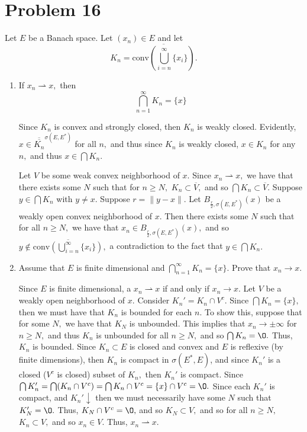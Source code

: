 \documentclass[11pt]{article}
\renewcommand{\emptyset}{\O}
\begin{document}
\section*{Problem 16}
\begin{problem}
    Let $E$ be a Banach space. Let $(x_n)\in E$ and let 
    \[K_n = \overline{\text{conv}\left(\bigcup_{i=n}^\infty\{x_i\}\right)}.\]
\end{problem}
\begin{enumerate}
    \item 
    \begin{problem}
        If $x_n \rightharpoonup x,$ then 
        \[\bigcap_{n=1}^\infty K_n = \{x\}\]
    \end{problem}
    \begin{solution}
    Since $K_n$ is convex and strongly closed, then $K_n$ is weakly closed. Evidently, $x\in \overline{\overline{K_n}}^{\sigma(E, E^*)}$ for all $n,$ and thus since $K_n$ is weakly closed, $x\in K_n$ for any $n,$ and thus $x\in \bigcap K_n.$

    Let $V$ be some weak convex neighborhood of $x.$ Since $x_n \rightharpoonup x,$ we have that there exists some $N$ such that for $n\geq N,$ $K_n \subset \overline{V},$ and so $\bigcap K_n \subset \overline{V}.$ Suppose $y\in \bigcap K_n$ with $y \neq x.$ Suppose $r = \|y-x\|.$ Let $B_{\frac{r}{2}, \sigma(E, E^*)}(x)$ be a weakly open convex neighborhood of $x.$ Then there exists some $N$ such that for all $n\geq N,$ we have that $x_n \in B_{\frac{r}{2}, \sigma(E, E^*)}(x),$ and so $y\notin \overline{\text{conv}\left(\bigcup_{i=n}^\infty \{x_i\}\right)},$ a contradiction to the fact that $y\in \bigcap K_n.$
    \end{solution}
    \item 
    \begin{problem}
        Assume that $E$ is finite dimensional and $\bigcap_{n=1}^\infty K_n = \{x\}.$ Prove that $x_n \to x.$
    \end{problem}
    \begin{solution}
        Since $E$ is finite dimensional, a $x_n \rightharpoonup x$ if and only if $x_n \to x.$ 
        Let $V$ be a weakly open neighborhood of $x.$ Consider $K_n' = K_n \cap V^c.$ Since $\bigcap K_n = \{x\},$ then we must have that $K_n$ is bounded for each $n.$ To show this, suppose that for some $N,$ we have that $K_N$ is unbounded. This implies that $x_n \to \pm \infty$  for $n\geq N,$ and thus $K_n$ is unbounded for all $n \geq N,$ and so $\bigcap K_n = \emptyset.$ Thus, $K_n$ is bounded. Since $K_n\subset E$ is closed  and convex and $E$ is reflexive (by finite dimensions), then $K_n$ is compact in $\sigma(E^*,E)$, and since $K_n'$ is a closed ($V^c$ is closed) subset of $K_n,$ then $K_n'$ is compact. Since $\bigcap K_n' = \bigcap (K_n \cap V^c) = \bigcap K_n \cap V^c = \{x\}\cap V^c = \emptyset.$ Since each $K_n'$ is compact, and $K_n' \downarrow$ then we must necessarily have some $N$ such that $K_N' = \emptyset.$ Thus, $K_N \cap V^c = \emptyset,$ and so $K_N \subset V,$ and so for all $n\geq N,$ $K_n \subset V,$ and so $x_n \in V.$ Thus, $x_n \rightharpoonup x.$
    \end{solution}
\end{enumerate}
\end{document}
